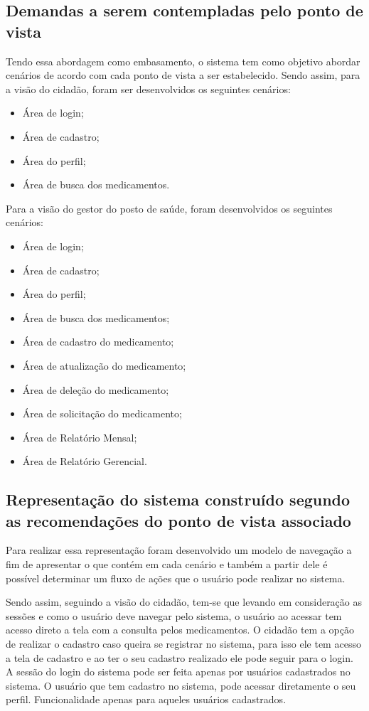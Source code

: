 \subsection{Demandas a serem contempladas pelo ponto de vista}

Tendo essa abordagem como embasamento, o sistema tem como objetivo abordar cenários de acordo com cada ponto de vista a ser estabelecido. Sendo assim, para a visão do cidadão, foram ser desenvolvidos os seguintes cenários:
\begin{itemize}
    \item Área de login;
    \item Área de cadastro;
    \item Área do perfil;
    \item Área de busca dos medicamentos.
\end{itemize}

Para a visão do gestor do posto de saúde, foram desenvolvidos os seguintes cenários:

\begin{itemize}
    \item Área de login;
    \item Área de cadastro;
    \item Área do perfil;
    \item Área de busca dos medicamentos;
    \item Área de cadastro do medicamento;
    \item Área de atualização do medicamento;
    \item Área de deleção do medicamento;
    \item Área de solicitação do medicamento;
    \item Área de Relatório Mensal;
    \item Área de Relatório Gerencial.
\end{itemize}

\subsection{Representação do sistema construído segundo as recomendações do ponto de vista associado}

Para realizar essa representação foram desenvolvido um modelo de navegação a fim de apresentar o que contém em cada cenário e também a partir dele é possível determinar um fluxo de ações que o usuário pode realizar no sistema. 

Sendo assim, seguindo a visão do cidadão, tem-se que levando em consideração as sessões e como o usuário deve navegar pelo sistema, o usuário ao acessar tem acesso direto a tela com a consulta pelos medicamentos.
O cidadão tem a opção de realizar o cadastro caso queira se registrar no sistema, para isso ele tem acesso a tela de cadastro e ao ter o seu cadastro realizado ele pode seguir para o login.
A sessão do login do sistema pode ser feita apenas por usuários cadastrados no sistema. 
O usuário que tem cadastro no sistema, pode acessar diretamente o seu perfil. Funcionalidade apenas para aqueles usuários cadastrados.

